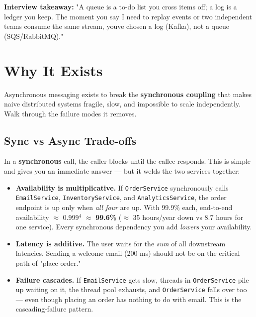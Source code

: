 \documentclass[11pt]{article}
\providecommand{\tightlist}{\setlength{\itemsep}{1pt}\setlength{\parskip}{0pt}}
\begin{document}
\textbf{Interview takeaway:} "A queue is a to-do list you cross items off; a log is a ledger you keep. The moment you say \textquotesingle I need to replay events\textquotesingle{} or \textquotesingle two independent teams consume the same stream,\textquotesingle{} you\textquotesingle ve chosen a log (Kafka), not a queue (SQS/RabbitMQ)."

\section{Why It Exists}\label{why-it-exists}

Asynchronous messaging exists to break the \textbf{synchronous coupling} that makes naive distributed systems fragile, slow, and impossible to scale independently. Walk through the failure modes it removes.

\subsection{Sync vs Async Trade-offs}\label{sync-vs-async-trade-offs}

In a \textbf{synchronous} call, the caller blocks until the callee responds. This is simple and gives you an immediate answer --- but it welds the two services together:

\begin{itemize}
\tightlist
\item
  \textbf{Availability is multiplicative.} If \texttt{OrderService} synchronously calls \texttt{EmailService}, \texttt{InventoryService}, and \texttt{AnalyticsService}, the order endpoint is up only when \emph{all four} are up. With 99.9\% each, end-to-end availability \(\approx\) 0.999\(^4\) \(\approx\) \textbf{99.6\%} (\(\approx\) 35 hours/year down vs 8.7 hours for one service). Every synchronous dependency you add \emph{lowers} your availability.
\item
  \textbf{Latency is additive.} The user waits for the \emph{sum} of all downstream latencies. Sending a welcome email (200 ms) should not be on the critical path of "place order."
\item
  \textbf{Failure cascades.} If \texttt{EmailService} gets slow, threads in \texttt{OrderService} pile up waiting on it, the thread pool exhausts, and \texttt{OrderService} falls over too --- even though placing an order has nothing to do with email. This is the cascading-failure pattern.
\end{itemize}

\setcodelang{}
\end{document}
